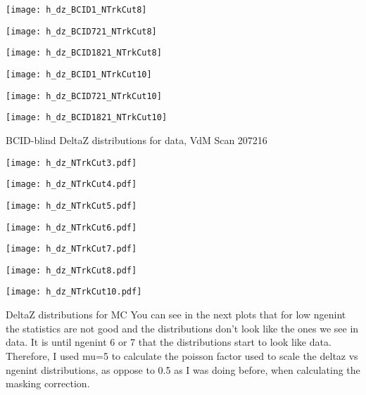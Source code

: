 \documentclass[8pt]{beamer}
\begin{document}
\begin{frame}
\center
\texttt{[image: h\_dz\_BCID1\_NTrkCut8]}
\end{frame}
\begin{frame}
\center
\texttt{[image: h\_dz\_BCID721\_NTrkCut8]}
\end{frame}
\begin{frame}
\center
\texttt{[image: h\_dz\_BCID1821\_NTrkCut8]}
\end{frame}
\begin{frame}
\center
\texttt{[image: h\_dz\_BCID1\_NTrkCut10]}
\end{frame}
\begin{frame}
\center
\texttt{[image: h\_dz\_BCID721\_NTrkCut10]}
\end{frame}
\begin{frame}
\center
\texttt{[image: h\_dz\_BCID1821\_NTrkCut10]}
\end{frame}
\begin{frame}
\centering
\large{BCID-blind DeltaZ distributions for data, VdM Scan 207216}
\end{frame}
\begin{frame}
\center
\texttt{[image: h\_dz\_NTrkCut3.pdf]}
\end{frame}
\begin{frame}
\center
\texttt{[image: h\_dz\_NTrkCut4.pdf]}
\end{frame}
\begin{frame}
\center
\texttt{[image: h\_dz\_NTrkCut5.pdf]}
\end{frame}
\begin{frame}
\center
\texttt{[image: h\_dz\_NTrkCut6.pdf]}
\end{frame}
\begin{frame}
\center
\texttt{[image: h\_dz\_NTrkCut7.pdf]}
\end{frame}
\begin{frame}
\center
\texttt{[image: h\_dz\_NTrkCut8.pdf]}
\end{frame}
\begin{frame}
\center
\texttt{[image: h\_dz\_NTrkCut10.pdf]}
\end{frame}
\begin{frame}
\centering
\large{DeltaZ distributions for MC}
\newline
You can see in the next plots that for low ngenint the statistics are not good and the distributions don't look like the ones we see in data. It is until ngenint 6 or 7 that the distributions start to look like data. Therefore, I used mu=5  to calculate the poisson factor used to scale the deltaz vs ngenint distributions, as oppose to 0.5 as I was doing before, when calculating the masking correction.
\end{frame}
\end{document}
